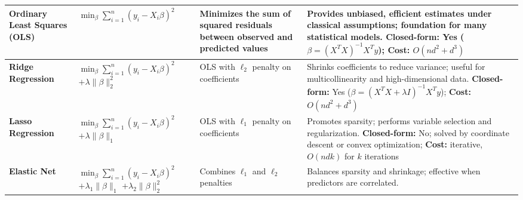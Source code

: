 \documentclass[10pt]{article}
\begin{document}
\begin{longtable}{|>{\bfseries}m{3cm}|m{5cm}|p{3.5cm}|p{8cm}|}
		Ordinary Least Squares (OLS) & \parbox{5cm}{
				$\min_{\beta} \sum_{i=1}^n (y_i - X_i\beta)^2$
		} & \parbox{3.5cm}{\vspace{2pt}Minimizes the sum of squared residuals between observed
		and predicted values} & \parbox{8cm}{\vspace{2pt}
				Provides unbiased, efficient estimates under classical assumptions; foundation for
				many statistical models. \\
				\textbf{Closed-form:} Yes ($\beta = (X^TX)^{-1}X^Ty$); \\
				\textbf{Cost:} $O(nd^2 + d^3)$
				\vspace{4pt}
		} \\
		\hline
		Ridge Regression & \parbox{5cm}{
				$\min_{\beta} \sum_{i=1}^n (y_i - X_i\beta)^2$
				$+ \lambda \lVert\beta\rVert_2^2$
		} & \parbox{3.5cm}{\vspace{2pt}OLS with $\ell_2$ penalty on coefficients} &
		\parbox{8cm}{\vspace{2pt}
				Shrinks coefficients to reduce variance; useful for multicollinearity and
				high-dimensional data. \\
				\textbf{Closed-form:} Yes ($\beta = (X^TX + \lambda I)^{-1}X^Ty$); \\
				\textbf{Cost:} $O(nd^2 + d^3)$
				\vspace{4pt}
		} \\
		\hline
		Lasso Regression & \parbox{5cm}{
				$\min_{\beta} \sum_{i=1}^n (y_i - X_i\beta)^2$
				$+ \lambda \lVert\beta\rVert_1$
		} & \parbox{3.5cm}{\vspace{2pt}OLS with $\ell_1$ penalty on coefficients} &
		\parbox{8cm}{\vspace{2pt}
				Promotes sparsity; performs variable selection and regularization. \\
				\textbf{Closed-form:} No; solved by coordinate descent or convex optimization; \\
				\textbf{Cost:} iterative, $O(ndk)$ for $k$ iterations
				\vspace{4pt}
		} \\
		\hline
		Elastic Net & \parbox{5cm}{
				$\min_{\beta} \sum_{i=1}^n (y_i - X_i\beta)^2$ \\
				$+ \lambda_1 \lVert\beta\rVert_1$
				$+ \lambda_2 \lVert\beta\rVert_2^2$
		} & \parbox{3.5cm}{\vspace{2pt}Combines $\ell_1$ and $\ell_2$ penalties} &
		\parbox{8cm}{\vspace{2pt}
				Balances sparsity and shrinkage; effective when predictors are correlated. \\
}
\end{longtable}
\end{document}
